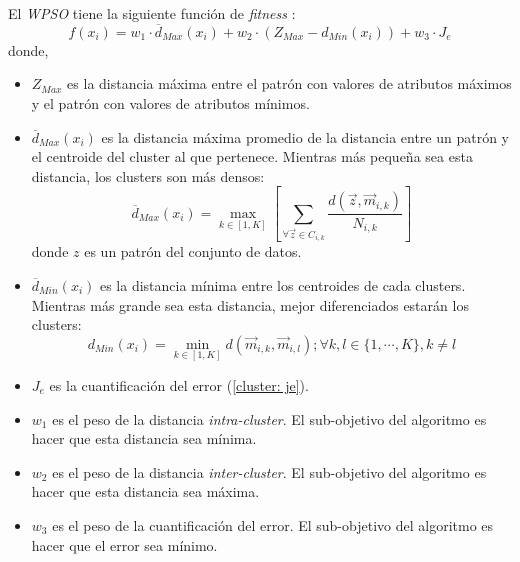     El \emph{WPSO} tiene la siguiente función de \emph{fitness} \cite{PSO_0}:
\begin{equation}\label{pso: wpso}
    f(x_i) = w_1 \cdot \overline{d}_{Max}(x_i) + w_2 \cdot (Z_{Max} - d_{Min}(x_i)) + w_3 \cdot J_e
\end{equation}
donde,
\begin{itemize}
    \item $Z_{Max}$ es la distancia máxima entre el patrón con valores de
atributos máximos y el patrón con valores de atributos mínimos.
    \item $\overline{d}_{Max}(x_i)$ es la distancia máxima promedio de la
distancia entre un patrón y el centroide del cluster al que pertenece. Mientras
más pequeña sea esta distancia, los clusters son más densos:
\begin{equation}\label{pso: dmax}
    \overline{d}_{Max}(x_i) = \displaystyle\max_{k \in [1,K]} \left[\displaystyle\sum_{\forall \overrightarrow{z} \in C_{i,k}} \displaystyle\frac{d(\overrightarrow{z}, \overrightarrow{m}_{i,k})}{N_{i,k}}\right]
\end{equation}
donde $z$ es un patrón del conjunto de datos.
    \item $\overline{d}_{Min}(x_i)$ es la distancia mínima entre los centroides
de cada clusters. Mientras más grande sea esta distancia, mejor diferenciados
estarán los clusters:
\begin{equation}\label{pso: dmin}
    d_{Min}(x_i) = \displaystyle\min_{k \in [1,K]} d(\overrightarrow{m}_{i,k}, \overrightarrow{m}_{i,l}); \forall k,l \in \{1, \cdots, K\},k \neq l
\end{equation}
    \item $J_e$ es la cuantificación del error (\ref{cluster: je}).
    \item $w_1$ es el peso de la distancia \emph{intra-cluster}. El sub-objetivo
del algoritmo es hacer que esta distancia sea mínima.
    \item $w_2$ es el peso de la distancia \emph{inter-cluster}. El sub-objetivo
del algoritmo es hacer que esta distancia sea máxima.
    \item $w_3$ es el peso de la cuantificación del error. El sub-objetivo del
algoritmo es hacer que el error sea mínimo.
\end{itemize}

